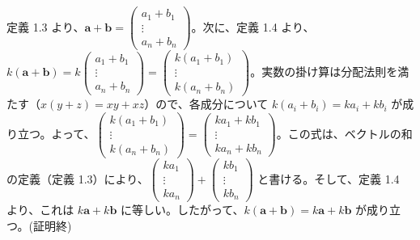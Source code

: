 \begin{thm}[スカラー倍の性質]
\begin{proof*}
定義 1.3 より、$\bm{a} + \bm{b} = \begin{pmatrix} a_1 + b_1 \\ \vdots \\ a_n + b_n \end{pmatrix}$。次に、定義 1.4 より、$k(\bm{a} + \bm{b}) = k \begin{pmatrix} a_1 + b_1 \\ \vdots \\ a_n + b_n \end{pmatrix} = \begin{pmatrix} k(a_1 + b_1) \\ \vdots \\ k(a_n + b_n) \end{pmatrix}$。実数の掛け算は分配法則を満たす（$x(y+z) = xy+xz$）ので、各成分について $k(a_i + b_i) = k a_i + k b_i$ が成り立つ。よって、$\begin{pmatrix} k(a_1 + b_1) \\ \vdots \\ k(a_n + b_n) \end{pmatrix} = \begin{pmatrix} k a_1 + k b_1 \\ \vdots \\ k a_n + k b_n \end{pmatrix}$。この式は、ベクトルの和の定義（定義 1.3）により、$\begin{pmatrix} k a_1 \\ \vdots \\ k a_n \end{pmatrix} + \begin{pmatrix} k b_1 \\ \vdots \\ k b_n \end{pmatrix}$ と書ける。そして、定義 1.4 より、これは $k\bm{a} + k\bm{b}$ に等しい。したがって、$k(\bm{a}+\bm{b}) = k\bm{a} + k\bm{b}$ が成り立つ。(証明終)
\end{proof*}
\end{thm}

